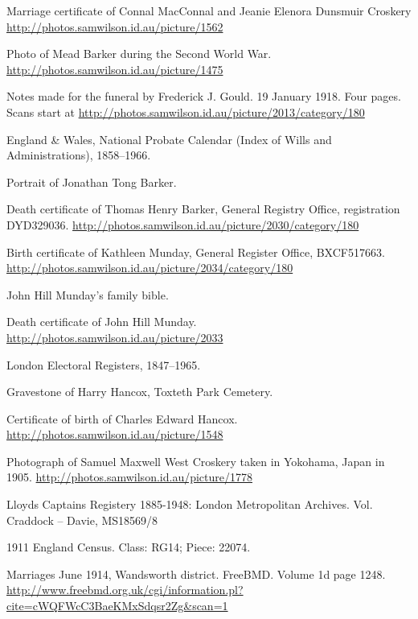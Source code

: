 \begin{thebibliography}{99}
	Marriage certificate of Connal MacConnal and Jeanie Elenora Dunsmuir Croskery
	\url{http://photos.samwilson.id.au/picture/1562}

	Photo of Mead Barker during the Second World War. \\
	\url{http://photos.samwilson.id.au/picture/1475}

	Notes made for the funeral by Frederick J. Gould. 19 January 1918.
	Four pages. Scans start at \url{http://photos.samwilson.id.au/picture/2013/category/180}

	England \& Wales, National Probate Calendar (Index of Wills and Administrations), 1858--1966.

	Portrait of Jonathan Tong Barker. \url{}

	Death certificate of Thomas Henry Barker, General Registry Office, registration DYD329036.
	\url{http://photos.samwilson.id.au/picture/2030/category/180}

	Birth certificate of Kathleen Munday, General Register Office, BXCF517663.
	\url{http://photos.samwilson.id.au/picture/2034/category/180}

	John Hill Munday's family bible.

	Death certificate of John Hill Munday.
	\url{http://photos.samwilson.id.au/picture/2033}

	London Electoral Registers, 1847--1965.

	Gravestone of Harry Hancox, Toxteth Park Cemetery.

	Certificate of birth of Charles Edward Hancox. \url{http://photos.samwilson.id.au/picture/1548}

	Photograph of Samuel Maxwell West Croskery taken in Yokohama, Japan in 1905.
	\url{http://photos.samwilson.id.au/picture/1778}

	Lloyds Captains Registery 1885-1948: London Metropolitan Archives. Vol. Craddock -- Davie, MS18569/8

	1911 England Census. Class: RG14; Piece: 22074.

	Marriages June 1914, Wandsworth district. FreeBMD. Volume 1d page 1248.
	\url{http://www.freebmd.org.uk/cgi/information.pl?cite=cWQFWcC3BaeKMxSdqsr2Zg&scan=1}


\end{thebibliography}
